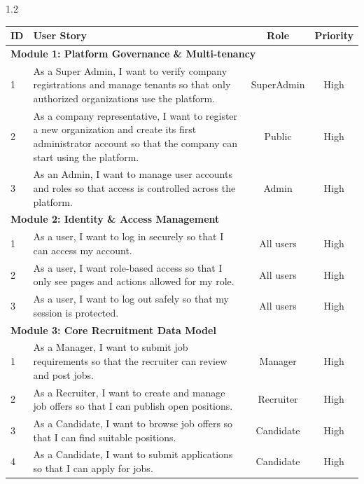 \begin{spacing}{1.2}
\begin{center}
\label{tab:sprint1_backlog}
\begin{tabularx}{\textwidth}{|l|X|c|c|}
\hline
\rowcolor{gray!20} \textbf{ID} & \textbf{User Story} & \textbf{Role} & \textbf{Priority} \\ \hline

\multicolumn{4}{|l|}{\cellcolor{gray!10}\textbf{Module 1: Platform Governance \& Multi-tenancy}} \\ \hline
1 & As a Super Admin, I want to verify company registrations and manage tenants so that only authorized organizations use the platform. & SuperAdmin & High \\ \hline
2 & As a company representative, I want to register a new organization and create its first administrator account so that the company can start using the platform. & Public & High \\ \hline
3 & As an Admin, I want to manage user accounts and roles so that access is controlled across the platform. & Admin & High \\ \hline

\multicolumn{4}{|l|}{\cellcolor{gray!10}\textbf{Module 2: Identity \& Access Management}} \\ \hline
1 & As a user, I want to log in securely so that I can access my account. & All users & High \\ \hline
2 & As a user, I want role-based access so that I only see pages and actions allowed for my role. & All users & High \\ \hline
3 & As a user, I want to log out safely so that my session is protected. & All users & High \\ \hline

\multicolumn{4}{|l|}{\cellcolor{gray!10}\textbf{Module 3: Core Recruitment Data Model}} \\ \hline
1 & As a Manager, I want to submit job requirements so that the recruiter can review and post jobs. & Manager & High \\ \hline
2 & As a Recruiter, I want to create and manage job offers so that I can publish open positions. & Recruiter & High \\ \hline
3 & As a Candidate, I want to browse job offers so that I can find suitable positions. & Candidate & High \\ \hline
4 & As a Candidate, I want to submit applications so that I can apply for jobs. & Candidate & High \\ \hline


\end{tabularx}
\end{center}
\end{spacing}
